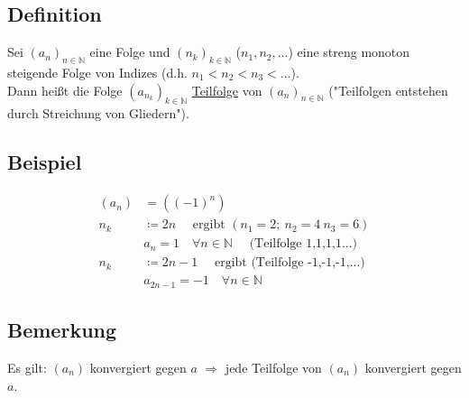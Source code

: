 \documentclass[12pt, titlepage]{article}
\newcommand{\N}{\mathds{N}}
\renewcommand{\*}{\cdot}
\begin{document}
	\subsection{Definition}
	Sei $(a_n)_{n\in\N}$ eine Folge und $(n_k)_{k\in\N}$ ($n_1,n_2,...$) eine streng monoton steigende Folge von Indizes (d.h. $n_1<n_2<n_3<...$).\\
	Dann heißt die Folge $(a_{n_k})_{k\in\N}$ \underline{Teilfolge} von $(a_n)_{n\in\N}$ ("Teilfolgen entstehen durch Streichung von Gliedern").
	\subsection{Beispiel}
	\begin{align*}
		(a_n)&=((-1)^n)\\
		n_k&\coloneqq 2n\quad\textrm{ ergibt  }(n_1=2;\ n_2=4\ n_3=6)\\
		&a_n=1\quad\forall n\in\N\quad\textrm{ (Teilfolge 1,1,1,1...)}\\
		n_k&\coloneqq 2n-1\quad\textrm{ ergibt (Teilfolge -1,-1,-1,...)}\\
		&a_{2n-1}=-1\quad\forall n\in\N
	\end{align*}
	\subsection{Bemerkung}
	Es gilt: $(a_n)$ konvergiert gegen $a$ $\Rightarrow$ jede Teilfolge von $(a_n)$ konvergiert gegen $a$.
	
	
	
	
	
	
	
	
	
	
	
	
	
	
	
	
	
	
	
	
	
	
	
	
	
	
	
\end{document}
